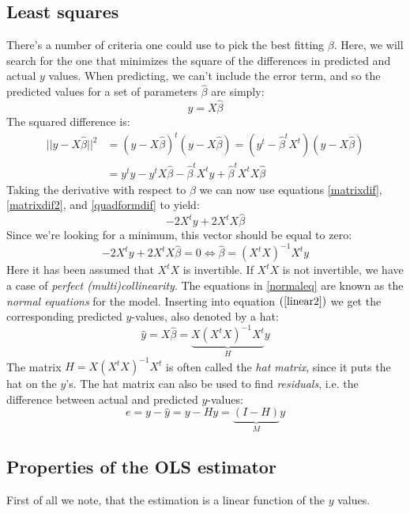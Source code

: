 \documentclass[12pt, a4paper]{article}
\begin{document}
\subsection{Least squares}
There's a number of criteria one could use to pick the best fitting $\beta$. Here, we will search for the one that minimizes the square of the differences in predicted and actual $y$ values. When predicting, we can't include the error term, and so the predicted values for a set of parameters $\hat{\beta}$ are simply:
\begin{equation}
y=X\hat{\beta}
\end{equation}
The squared difference is:
\begin{align*}
||y-X\hat{\beta}||^2 &=(y-X\hat{\beta})^t(y-X\hat{\beta})=(y^t-\hat{\beta}^t X^t)(y-X\hat{\beta})\\
&=y^t y - y^t X\hat{\beta} - \hat{\beta}^t X^t y + \hat{\beta}^t X^t X\hat{\beta}
\end{align*}
Taking the derivative with respect to $\beta$ we can now use equations \ref{matrixdif}, \ref{matrixdif2}, and \ref{quadformdif} to yield:
\begin{equation}
-2X^t y + 2X^t X\hat{\beta}
\end{equation}
Since we're looking for a minimum, this vector should be equal to zero:
\begin{equation}
\label{normaleq}
-2X^t y + 2X^t X\hat{\beta}=0\Leftrightarrow\hat{\beta}=(X^t X)^{-1}X^t y
\end{equation}
Here it has been assumed that $X^t X$ is invertible. If $X^t X$ is not invertible, we have a case of \textit{perfect (multi)collinearity}. The equations in \ref{normaleq} are known as the \textit{normal equations} for the model. Inserting into equation $(\ref{linear2})$ we get the corresponding predicted $y$-values, also denoted by a hat:
\begin{equation}
\hat{y}=X\hat{\beta}=\underbrace{X(X^t X)^{-1}X^t}_{H}y
\end{equation}
The matrix $H=X(X^t X)^{-1}X^t$ is often called the \textit{hat matrix}, since it puts the hat on the $y$'s. The hat matrix can also be used to find \textit{residuals}, i.e. the difference between actual and predicted $y$-values:
\begin{equation}
e=y-\hat{y}=y-Hy=\underbrace{(I-H)}_{M} y
\end{equation}

\subsection{Properties of the OLS estimator}
First of all we note, that the estimation is a linear function of the $y$ values.
\end{document}
